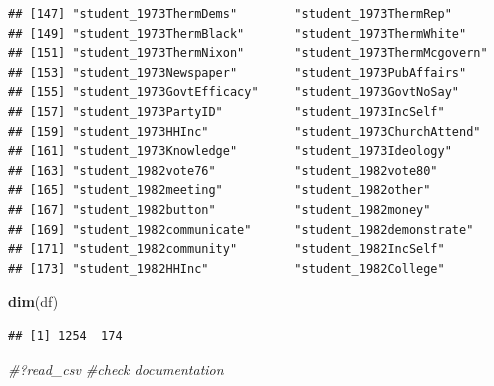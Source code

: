 \documentclass[
]{article}
\newenvironment{Shaded}{\begin{snugshade}}{\end{snugshade}}
\newcommand{\CommentTok}[1]{\textcolor[rgb]{0.56,0.35,0.01}{\textit{#1}}}
\newcommand{\FunctionTok}[1]{\textcolor[rgb]{0.13,0.29,0.53}{\textbf{#1}}}
\newcommand{\NormalTok}[1]{#1}
\begin{document}
\begin{verbatim}
## [147] "student_1973ThermDems"        "student_1973ThermRep"        
## [149] "student_1973ThermBlack"       "student_1973ThermWhite"      
## [151] "student_1973ThermNixon"       "student_1973ThermMcgovern"   
## [153] "student_1973Newspaper"        "student_1973PubAffairs"      
## [155] "student_1973GovtEfficacy"     "student_1973GovtNoSay"       
## [157] "student_1973PartyID"          "student_1973IncSelf"         
## [159] "student_1973HHInc"            "student_1973ChurchAttend"    
## [161] "student_1973Knowledge"        "student_1973Ideology"        
## [163] "student_1982vote76"           "student_1982vote80"          
## [165] "student_1982meeting"          "student_1982other"           
## [167] "student_1982button"           "student_1982money"           
## [169] "student_1982communicate"      "student_1982demonstrate"     
## [171] "student_1982community"        "student_1982IncSelf"         
## [173] "student_1982HHInc"            "student_1982College"
\end{verbatim}

\begin{Shaded}
\begin{Highlighting}[]
\FunctionTok{dim}\NormalTok{(df)}
\end{Highlighting}
\end{Shaded}

\begin{verbatim}
## [1] 1254  174
\end{verbatim}

\begin{Shaded}
\begin{Highlighting}[]
\CommentTok{\#?read\_csv  \#check documentation }
\end{Highlighting}
\end{Shaded}
\end{document}
